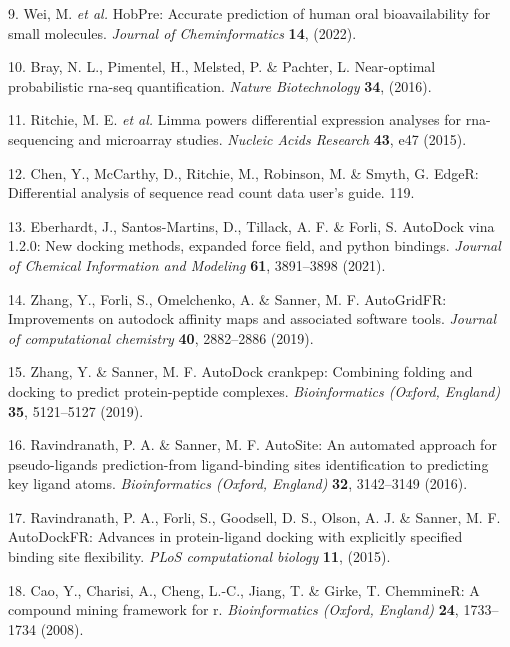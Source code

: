 \documentclass[
]{article}
\newenvironment{cslreferences}%
  {}%
  {\par}
\begin{document}
\begin{cslreferences}
\leavevmode\hypertarget{ref-HobpreAccuratWeiM2022}{}%
9. Wei, M. \emph{et al.} HobPre: Accurate prediction of human oral bioavailability for small molecules. \emph{Journal of Cheminformatics} \textbf{14}, (2022).

\leavevmode\hypertarget{ref-NearOptimalPrBray2016}{}%
10. Bray, N. L., Pimentel, H., Melsted, P. \& Pachter, L. Near-optimal probabilistic rna-seq quantification. \emph{Nature Biotechnology} \textbf{34}, (2016).

\leavevmode\hypertarget{ref-LimmaPowersDiRitchi2015}{}%
11. Ritchie, M. E. \emph{et al.} Limma powers differential expression analyses for rna-sequencing and microarray studies. \emph{Nucleic Acids Research} \textbf{43}, e47 (2015).

\leavevmode\hypertarget{ref-EdgerDifferenChen}{}%
12. Chen, Y., McCarthy, D., Ritchie, M., Robinson, M. \& Smyth, G. EdgeR: Differential analysis of sequence read count data user's guide. 119.

\leavevmode\hypertarget{ref-AutodockVina1Eberha2021}{}%
13. Eberhardt, J., Santos-Martins, D., Tillack, A. F. \& Forli, S. AutoDock vina 1.2.0: New docking methods, expanded force field, and python bindings. \emph{Journal of Chemical Information and Modeling} \textbf{61}, 3891--3898 (2021).

\leavevmode\hypertarget{ref-AutogridfrImpZhang2019}{}%
14. Zhang, Y., Forli, S., Omelchenko, A. \& Sanner, M. F. AutoGridFR: Improvements on autodock affinity maps and associated software tools. \emph{Journal of computational chemistry} \textbf{40}, 2882--2886 (2019).

\leavevmode\hypertarget{ref-AutodockCrankpZhang2019}{}%
15. Zhang, Y. \& Sanner, M. F. AutoDock crankpep: Combining folding and docking to predict protein-peptide complexes. \emph{Bioinformatics (Oxford, England)} \textbf{35}, 5121--5127 (2019).

\leavevmode\hypertarget{ref-AutositeAnAuRavind2016}{}%
16. Ravindranath, P. A. \& Sanner, M. F. AutoSite: An automated approach for pseudo-ligands prediction-from ligand-binding sites identification to predicting key ligand atoms. \emph{Bioinformatics (Oxford, England)} \textbf{32}, 3142--3149 (2016).

\leavevmode\hypertarget{ref-AutodockfrAdvRavind2015}{}%
17. Ravindranath, P. A., Forli, S., Goodsell, D. S., Olson, A. J. \& Sanner, M. F. AutoDockFR: Advances in protein-ligand docking with explicitly specified binding site flexibility. \emph{PLoS computational biology} \textbf{11}, (2015).

\leavevmode\hypertarget{ref-ChemminerACoCaoY2008}{}%
18. Cao, Y., Charisi, A., Cheng, L.-C., Jiang, T. \& Girke, T. ChemmineR: A compound mining framework for r. \emph{Bioinformatics (Oxford, England)} \textbf{24}, 1733--1734 (2008).
\end{cslreferences}
\end{document}
